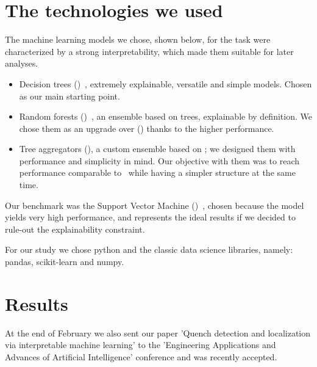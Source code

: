 \documentclass[a4paper, notitlepage]{article}
\begin{document}
\section{The technologies we used}
The machine learning models we chose, shown below, for the task were characterized by a strong
interpretability, which made them suitable for later analyses.
\begin{itemize}
	\item Decision trees (\dts)~\cite{breiman1984-dt}, extremely explainable, versatile and
	      simple models. Chosen as our main starting point.
	\item Random forests (\rfs)~\cite{breiman2001-rf}, an ensemble based on trees, explainable
	      by definition. We chose them as an upgrade over (\dts) thanks to the higher
	      performance.
	\item Tree aggregators (\tas), a custom ensemble based on \dts; we designed them with
	      performance and simplicity in mind. Our objective with them was to reach performance
	      comparable to \rfs\ while having a simpler structure at the same time.
\end{itemize}
Our benchmark was the Support Vector Machine (\svm)~\cite{cortes1995-svm}, chosen because the model
yields very high performance, and represents the ideal results if we decided to rule-out the explainability constraint.

For our study we chose python and the classic data science libraries, namely: pandas,
scikit-learn and numpy.

\section{Results}
At the end of February we also sent our paper 'Quench detection and localization via
interpretable machine learning' to the 'Engineering Applications and Advances of Artificial
Intelligence' conference and was recently accepted.
\end{document}

